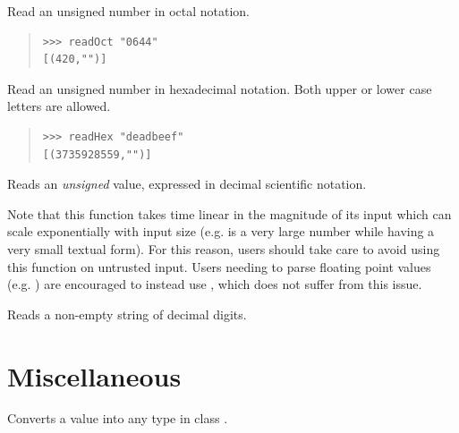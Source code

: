 \begin{haddockdesc}
\item[\begin{tabular}{@{}l}
readOct :: (Eq a, Num a) => ReadS a
\end{tabular}]
{\haddockbegindoc
Read an unsigned number in octal notation.\par
\begin{quote}
{\haddockverb\begin{verbatim}
>>> readOct "0644"
[(420,"")]

\end{verbatim}}
\end{quote}}
\end{haddockdesc}
\begin{haddockdesc}
\item[\begin{tabular}{@{}l}
readHex :: (Eq a, Num a) => ReadS a
\end{tabular}]
{\haddockbegindoc
Read an unsigned number in hexadecimal notation.
 Both upper or lower case letters are allowed.\par
\begin{quote}
{\haddockverb\begin{verbatim}
>>> readHex "deadbeef"
[(3735928559,"")]

\end{verbatim}}
\end{quote}}
\end{haddockdesc}
\begin{haddockdesc}
\item[\begin{tabular}{@{}l}
readFloat :: RealFrac a => ReadS a
\end{tabular}]
{\haddockbegindoc
Reads an \emph{unsigned}  value,
 expressed in decimal scientific notation.\par
Note that this function takes time linear in the magnitude of its input
 which can scale exponentially with input size (e.g.  is a
 very large number while having a very small textual form).
 For this reason, users should take care to avoid using this function on
 untrusted input. Users needing to parse floating point values
 (e.g. ) are encouraged to instead use , which does
 not suffer from this issue.\par}
\end{haddockdesc}
\begin{haddockdesc}
\item[\begin{tabular}{@{}l}
lexDigits :: ReadS String
\end{tabular}]
{\haddockbegindoc
Reads a non-empty string of decimal digits.\par}
\end{haddockdesc}
\section{Miscellaneous}
\begin{haddockdesc}
\item[\begin{tabular}{@{}l}
fromRat :: RealFloat a => Rational -> a
\end{tabular}]
{\haddockbegindoc
Converts a  value into any type in class .\par}
\end{haddockdesc}